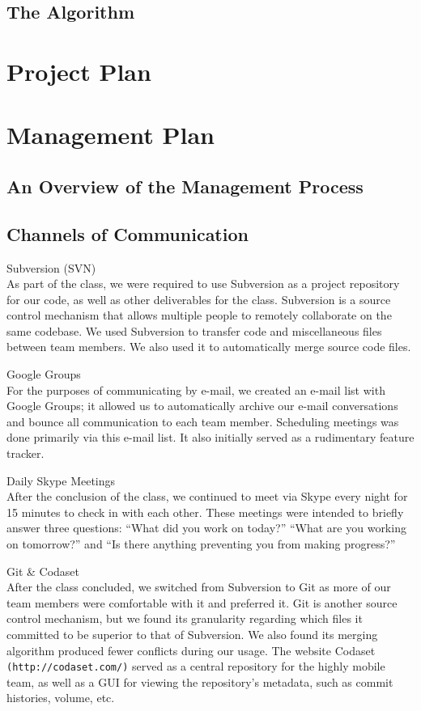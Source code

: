 \documentclass[12pt,article]{memoir}
\begin{document}
\section{The Algorithm}

\chapter{Project Plan} %
\chapter{Management Plan} %
\section{An Overview of the Management Process}
\section{Channels of Communication}
\begin{description}
\item{Subversion (SVN)} \\As part of the class, we were required to use Subversion as a project repository for our code, as well as other deliverables for the class. Subversion is a source control mechanism that allows multiple people to remotely collaborate on the same codebase. We used Subversion to transfer code and miscellaneous files between team members. We also used it to automatically merge source code files.
\item{Google Groups} \\For the purposes of communicating by e-mail, we created an e-mail list with Google Groups; it allowed us to automatically archive our e-mail conversations and bounce all communication to each team member. Scheduling meetings was done primarily via this e-mail list. It also initially served as a rudimentary feature tracker.
\item{Daily Skype Meetings} \\After the conclusion of the class, we continued to meet via Skype every night for 15 minutes to check in with each other. These meetings were intended to briefly answer three questions: ``What did you work on today?'' ``What are you working on tomorrow?'' and ``Is there anything preventing you from making progress?''
\item{Git \& Codaset} \\After the class concluded, we switched from Subversion to Git as more of our team members were comfortable with it and preferred it. Git is another source control mechanism, but we found its granularity regarding which files it committed to be superior to that of Subversion. We also found its merging algorithm produced fewer conflicts during our usage. The website Codaset \texttt{(http://codaset.com/)} served as a central repository for the highly mobile team, as well as a GUI for viewing the repository's metadata, such as commit histories, volume, etc.
\end{description}
\end{document}
